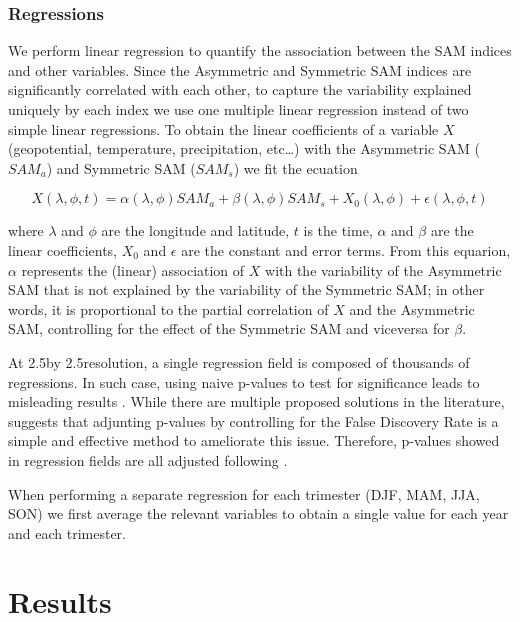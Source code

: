 \documentclass[twocol]{ametsocV5}
\begin{document}
\subsubsection{Regressions}

We perform linear regression to quantify the association between the SAM
indices and other variables. Since the Asymmetric and Symmetric SAM
indices are significantly correlated with each other, to capture the
variability explained uniquely by each index we use one multiple linear
regression instead of two simple linear regressions. To obtain the
linear coefficients of a variable \(X\) (geopotential, temperature,
precipitation, etc\ldots{}) with the Asymmetric SAM (\(SAM_a\)) and
Symmetric SAM (\(SAM_s\)) we fit the ecuation

\[
X(\lambda, \phi, t) = \alpha(\lambda, \phi) SAM_a + \beta(\lambda, \phi) SAM_s + X_0(\lambda, \phi) +  \epsilon(\lambda, \phi, t)
\]

where \(\lambda\) and \(\phi\) are the longitude and latitude, \(t\) is
the time, \(\alpha\) and \(\beta\) are the linear coefficients, \(X_0\)
and \(\epsilon\) are the constant and error terms. From this equarion,
\(\alpha\) represents the (linear) association of \(X\) with the
variability of the Asymmetric SAM that is not explained by the
variability of the Symmetric SAM; in other words, it is proportional to
the partial correlation of \(X\) and the Asymmetric SAM, controlling for
the effect of the Symmetric SAM and viceversa for \(\beta\).

At 2.5\degree by 2.5\degree resolution, a single regression field is
composed of thousands of regressions. In such case, using naive p-values
to test for significance leads to misleading results
\citep{walker1914, katz1991}. While there are multiple proposed
solutions in the literature, \citet{wilks2016} suggests that adjunting
p-values by controlling for the False Discovery Rate
\citep{benjamini1995} is a simple and effective method to ameliorate
this issue. Therefore, p-values showed in regression fields are all
adjusted following \citet{benjamini1995}.

When performing a separate regression for each trimester (DJF, MAM, JJA,
SON) we first average the relevant variables to obtain a single value
for each year and each trimester.

\section{Results}
\end{document}
